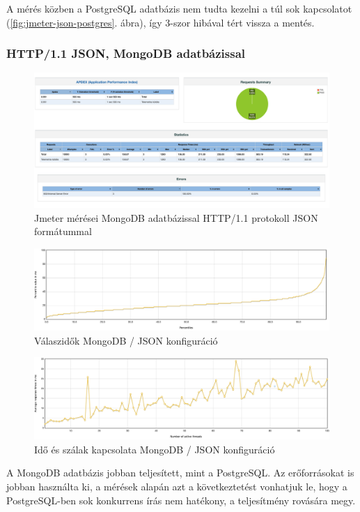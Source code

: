 A mérés közben a PostgreSQL adatbázis nem tudta kezelni a túl sok kapcsolatot (\ref{fig:jmeter-json-postgres}. ábra), így 3-szor hibával tért vissza a mentés.

\subsubsection{HTTP/1.1 JSON, MongoDB adatbázissal}
\begin{figure}[hbt!]
    \centering
    \includegraphics[scale=0.2]{images/jmeter-json-postgres}
    \caption{Jmeter mérései MongoDB adatbázissal HTTP/1.1 protokoll JSON formátummal}
    \label{fig:jmeter-json-mongo}
\end{figure}

\begin{figure}[hbt!]
    \centering
    \includegraphics[scale=0.3]{images/json-mongo-response-times}
    \caption{Válaszidők MongoDB / JSON konfiguráció}
    \label{fig:json-mongo-response-times}
\end{figure}

\begin{figure}[hbt!]
    \centering
    \includegraphics[scale=0.3]{images/json-mongo-time-vs-threads}
    \caption{Idő és szálak kapcsolata MongoDB / JSON konfiguráció}
    \label{fig:json-mongo-time-vs-threads}
\end{figure}
\begin{remark}
    A MongoDB adatbázis jobban teljesített, mint a PostgreSQL.
    Az erőforrásokat is jobban használta ki, a mérések alapán azt a következtetést vonhatjuk le, hogy a PostgreSQL-ben sok konkurrens írás nem hatékony, a teljesítmény rovására megy.
\end{remark}

